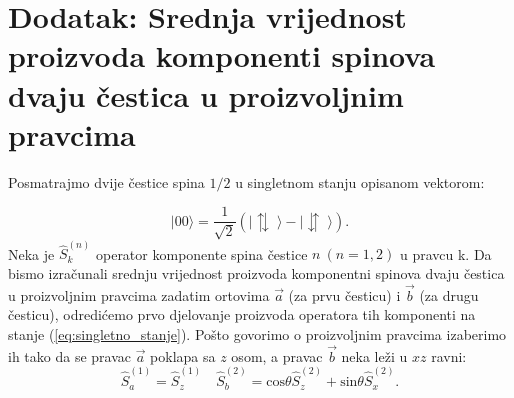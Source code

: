 \appendix
\chapter*{Dodatak: Srednja vrijednost proizvoda komponenti spinova dvaju \v cestica u proizvoljnim pravcima}
\setcounter{chapter}{4} \setcounter{equation}{0}

Posmatrajmo dvije čestice spina $1/2$ u singletnom stanju opisanom vektorom:

\begin{equation}
    | 00 \rangle = \frac{1}{\sqrt2}(| \updownarrows \; \rangle - | \downuparrows \; \rangle) \label{eq:singletno_stanje}.
\end{equation}
Neka je $\hat{S}_k^{(n)}$ operator komponente spina čestice $n \ (n = 1, 2)$ u pravcu k. Da bismo izračunali srednju vrijednost proizvoda komponentni spinova dvaju čestica u proizvoljnim pravcima zadatim ortovima $\vec{a}$ (za prvu česticu) i $\vec{b}$ (za drugu česticu), odredićemo prvo djelovanje proizvoda operatora tih komponenti na stanje (\ref{eq:singletno_stanje}).
Pošto govorimo o proizvoljnim pravcima izaberimo ih tako da se pravac $\vec{a}$ poklapa sa $z$ osom, a pravac $\vec{b}$ neka leži u $xz$ ravni:
\begin{equation*}
    \hat{S}_a^{(1)} = \hat{S}_z^{(1)} \quad \hat{S}_b^{(2)} = \mathrm{cos}{\theta} \hat{S}_z^{(2)} + \mathrm{sin}{\theta} \hat{S}_x^{(2)}.
\end{equation*}



